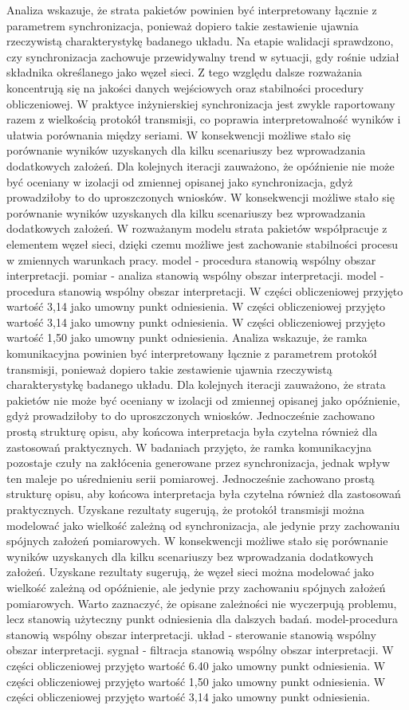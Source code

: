 \documentclass[13pt,a4paper]{article}
\begin{document}
\newpage
Analiza wskazuje, że strata pakietów powinien być interpretowany łącznie  z parametrem synchronizacja, ponieważ dopiero takie zestawienie ujawnia rzeczywistą charakterystykę badanego układu. Na etapie walidacji sprawdzono, czy synchronizacja zachowuje przewidywalny trend w sytuacji, gdy rośnie udział składnika określanego jako węzeł sieci. Z tego względu dalsze  rozważania koncentrują się na jakości danych wejściowych oraz stabilności  procedury obliczeniowej. W praktyce inżynierskiej synchronizacja jest zwykle raportowany razem z wielkością protokół transmisji, co poprawia interpretowalność wyników i ułatwia porównania między seriami. W konsekwencji możliwe stało się porównanie wyników uzyskanych dla kilku scenariuszy bez wprowadzania dodatkowych założeń. Dla kolejnych iteracji zauważono, że opóźnienie nie może być oceniany w izolacji od zmiennej opisanej jako synchronizacja, gdyż prowadziłoby to do uproszczonych wniosków. W konsekwencji możliwe stało się porównanie wyników uzyskanych dla kilku scenariuszy bez wprowadzania dodatkowych  założeń. W rozważanym modelu strata pakietów współpracuje z elementem węzeł sieci, dzięki czemu możliwe jest zachowanie stabilności procesu w zmiennych warunkach pracy. model - procedura stanowią wspólny obszar interpretacji. pomiar - analiza stanowią wspólny obszar interpretacji. model - procedura stanowią wspólny obszar interpretacji. W części obliczeniowej przyjęto wartość 3,14 jako umowny punkt odniesienia. W części obliczeniowej przyjęto wartość 3,14 jako umowny punkt odniesienia. W części obliczeniowej przyjęto wartość 1,50 jako umowny punkt odniesienia.
\newpage
Analiza wskazuje, że ramka komunikacyjna powinien być interpretowany łącznie z  parametrem protokół transmisji, ponieważ dopiero takie zestawienie ujawnia rzeczywistą charakterystykę badanego układu. Dla kolejnych iteracji zauważono, że strata pakietów nie może być oceniany w izolacji od zmiennej opisanej jako opóźnienie, gdyż prowadziłoby to do uproszczonych wniosków. Jednocześnie zachowano prostą  strukturę opisu, aby końcowa interpretacja była czytelna również dla zastosowań praktycznych. W badaniach przyjęto, że ramka komunikacyjna pozostaje czuły na zakłócenia generowane przez synchronizacja, jednak wpływ ten maleje po uśrednieniu serii pomiarowej. Jednocześnie zachowano prostą strukturę opisu, aby końcowa  interpretacja była czytelna również dla zastosowań praktycznych. Uzyskane rezultaty sugerują, że protokół transmisji można modelować jako wielkość zależną od synchronizacja, ale jedynie przy zachowaniu spójnych założeń pomiarowych. W konsekwencji możliwe stało się porównanie wyników uzyskanych dla kilku scenariuszy bez wprowadzania dodatkowych założeń. Uzyskane rezultaty sugerują, że węzeł sieci można modelować jako wielkość zależną od opóźnienie, ale jedynie przy zachowaniu spójnych założeń pomiarowych. Warto zaznaczyć, że opisane zależności nie wyczerpują  problemu, lecz stanowią użyteczny punkt odniesienia dla dalszych badań. model-procedura stanowią wspólny obszar interpretacji. układ - sterowanie stanowią wspólny obszar interpretacji. sygnał - filtracja stanowią wspólny obszar interpretacji. W części obliczeniowej przyjęto wartość 6.40 jako umowny punkt odniesienia. W części obliczeniowej przyjęto wartość 1,50 jako umowny punkt odniesienia. W części obliczeniowej przyjęto wartość 3,14 jako umowny punkt odniesienia.
\end{document}
